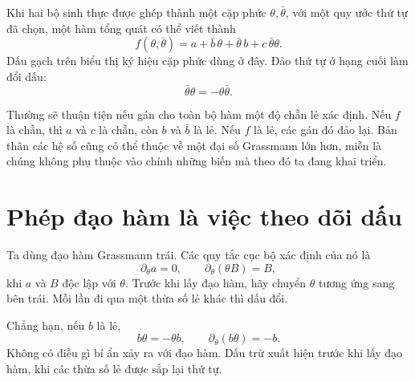 Khi hai bộ sinh thực được ghép thành một cặp phức \(\theta,\bar\theta\), với một quy ước thứ tự đã chọn, một hàm tổng quát có thể viết thành
\begin{equation}
f(\theta,\bar\theta)
=a+\bar b\,\theta+\bar\theta\,b+c\,\bar\theta\theta.
\end{equation}
Dấu gạch trên biểu thị ký hiệu cặp phức dùng ở đây. Đảo thứ tự ở hạng cuối làm đổi dấu:
\begin{equation}
\bar\theta\theta=-\theta\bar\theta.
\end{equation}

Thường sẽ thuận tiện nếu gán cho toàn bộ hàm một độ chẵn lẻ xác định. Nếu \(f\) là chẵn, thì \(a\) và \(c\) là chẵn, còn \(b\) và \(\bar b\) là lẻ. Nếu \(f\) là lẻ, các gán đó đảo lại. Bản thân các hệ số cũng có thể thuộc về một đại số Grassmann lớn hơn, miễn là chúng không phụ thuộc vào chính những biến mà theo đó ta đang khai triển.

\begin{classroomqa}
\end{classroomqa}

\section{Phép đạo hàm là việc theo dõi dấu}

Ta dùng đạo hàm Grassmann trái. Các quy tắc cục bộ xác định của nó là
\begin{equation}
\partial_\theta a=0,
\qquad
\partial_\theta(\theta B)=B,
\end{equation}
khi \(a\) và \(B\) độc lập với \(\theta\). Trước khi lấy đạo hàm, hãy chuyển \(\theta\) tương ứng sang bên trái. Mỗi lần đi qua một thừa số lẻ khác thì dấu đổi.

Chẳng hạn, nếu \(b\) là lẻ,
\begin{equation}
b\theta=-\theta b,
\qquad
\partial_\theta(b\theta)=-b.
\end{equation}
Không có điều gì bí ẩn xảy ra với đạo hàm. Dấu trừ xuất hiện trước khi lấy đạo hàm, khi các thừa số lẻ được sắp lại thứ tự.

